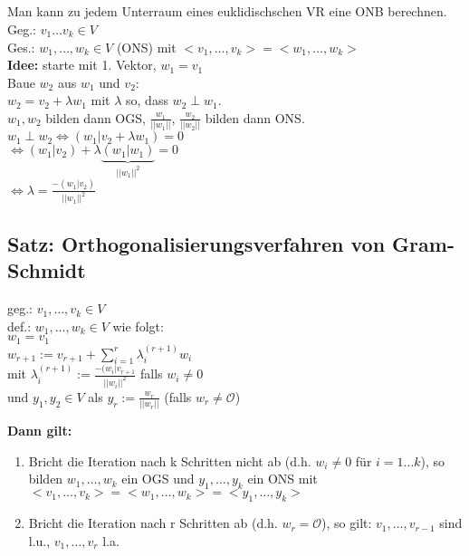 \subsection*{}
Man kann zu jedem Unterraum eines euklidischschen VR eine ONB berechnen.\\
Geg.: $v_1\dots v_k\in V$\\
Ges.: $w_1,\dots, w_k\in V$ (ONS) mit $<v_1,\dots,v_k>=<w_1,\dots,w_k>$\\
\textbf{Idee:} starte mit 1. Vektor, $w_1=v_1$\\
Baue $w_2$ aus $w_1$ und $v_2$:\\
$w_2=v_2+\lambda w_1$ mit $\lambda$ so, dass $w_2 \perp w_1$.\\
$w_1,w_2$ bilden dann OGS, $\frac{w_1}{||w_1||}$, $\frac{w_2}{||w_2||}$ bilden dann ONS.\\
$w_1 \perp w_2 \Leftrightarrow (w_1|v_2+\lambda w_1)=0$\\
$\Leftrightarrow (w_1|v_2)+\lambda\underbrace{(w_1|w_1)}_{||w_1||^2}=0$\\
$\Leftrightarrow \lambda=\frac{-(w_1|v_2)}{||w_1||^2}$


\subsection{Satz: Orthogonalisierungsverfahren von Gram-Schmidt}
geg.: $v_1,\dots,v_k\in V$\\
def.: $w_1,\dots,w_k\in V$ wie folgt:\\
$w_1=v_1$\\
$w_{r+1}:=v_{r+1}+\sum_{i=1}^r \lambda_i^{(r+1)}w_i$\\
mit $\lambda_i^{(r+1)} := \frac{-(w_i|v_{r+1}}{||w_i||^2}$ falls $w_i\neq 0$\\
und $y_1,y_2\in V$ als $y_r:=\frac{w_r}{||w_r||}$ (falls $w_r\neq \mathcal{O}$)

\textbf{Dann gilt:}\begin{enumerate}
\item
Bricht die Iteration nach k Schritten nicht ab (d.h. $w_i\neq 0$ für $i=1\dots k$), so bilden $w_1,\dots,w_k$ ein OGS und $y_1,\dots,y_k$ ein ONS mit $<v_1,\dots,v_k>=<w_1,\dots,w_k>=<y_1,\dots,y_k>$

\item
Bricht die Iteration nach r Schritten ab (d.h. $w_r=\mathcal{O}$), so gilt: $v_1,\dots,v_{r-1}$ sind l.u., $v_1,\dots,v_r$ l.a.
\end{enumerate}

